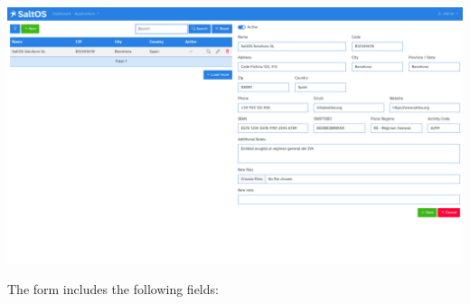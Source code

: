\documentclass[a4paper]{article}
\begin{document}
\begin{center}\includegraphics[width=1\textwidth]{../ujest/snaps/test-screenshots-js-screenshots-company-company-edit-1-en-us-1-snap.png}\end{center}

The form includes the following fields:
\end{document}
